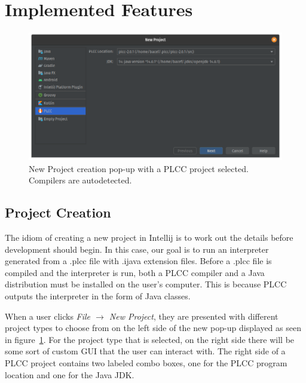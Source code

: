 \documentclass[conference, letterpaper]{IEEEtran}
\begin{document}
\section{Implemented Features}\label{sec:implemented-features}
\begin{figure}[!t]
    \centering
    \includegraphics[width=6in]{proj_config.png}
    \caption{New Project creation pop-up with a PLCC project selected. Compilers are autodetected.}
    \label{fig:proj_config}
\end{figure}

\subsection{Project Creation}\label{subsec:project-creation}
The idiom of creating a new project in Intellij is to work out the details before development should begin.
In this case, our goal is to run an interpreter generated from a .plcc file with .ijava extension files.
Before a .plcc file is compiled and the interpreter is run, both a PLCC compiler and a Java distribution must be installed on the user's computer.
This is because PLCC outputs the interpreter in the form of Java classes.

When a user clicks \textit{File $\rightarrow$ New Project}, they are presented with different project types to choose from on the left side of the new pop-up displayed as seen in figure~\ref{fig:proj_config}.
For the project type that is selected, on the right side there will be some sort of custom GUI that the user can interact with.
The right side of a PLCC project contains two labeled combo boxes, one for the PLCC program location and one for the Java JDK.
\end{document}
